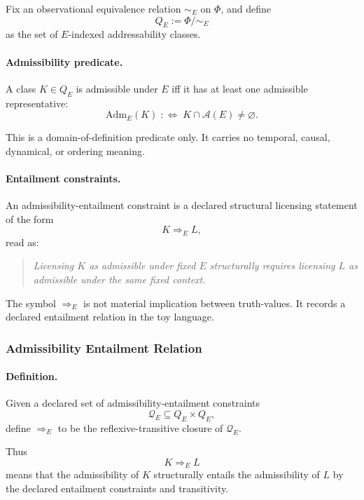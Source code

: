\documentclass[aps,prx,onecolumn,11pt]{revtex4-2}
\theoremstyle{plain}
\theoremstyle{definition}
\theoremstyle{remark}
\begin{document}
Fix an observational equivalence relation \(\sim_E\) on \(\Phi\), and
define
\[
Q_E:=\Phi/{\sim_E}
\]
as the set of \(E\)-indexed addressability classes.

\paragraph{Admissibility predicate.}

A class \(K\in Q_E\) is admissible under \(E\) iff it has at least one
admissible representative:
\begin{equation}
\mathrm{Adm}_E(K)
\;:\Longleftrightarrow\;
K\cap\mathcal A(E)\neq\varnothing.
\label{eq:toy_entailment_class_admissible}
\end{equation}

This is a domain-of-definition predicate only. It carries no temporal,
causal, dynamical, or ordering meaning.

\paragraph{Entailment constraints.}

An admissibility-entailment constraint is a declared structural
licensing statement of the form
\[
K\Rightarrow_E L,
\]
read as:
\begin{quote}
\emph{Licensing \(K\) as admissible under fixed \(E\) structurally
requires licensing \(L\) as admissible under the same fixed context.}
\end{quote}

The symbol \(\Rightarrow_E\) is not material implication between
truth-values. It records a declared entailment relation in the toy
language.

\subsubsection{Admissibility Entailment Relation}
\label{toy:admissibility_entailment:relation}

\paragraph{Definition.}

Given a declared set of admissibility-entailment constraints
\[
\mathcal Q_E\subseteq Q_E\times Q_E,
\]
define \(\Rightarrow_E\) to be the reflexive-transitive closure of
\(\mathcal Q_E\).

Thus
\[
K\Rightarrow_E L
\]
means that the admissibility of \(K\) structurally entails the
admissibility of \(L\) by the declared entailment constraints and
transitivity.
\end{document}
